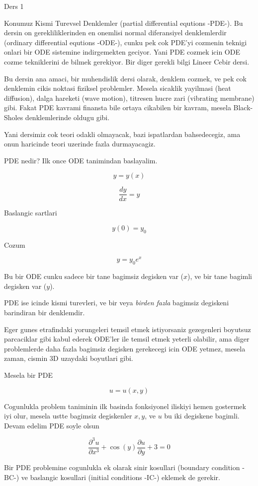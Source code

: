\documentclass[12pt,fleqn]{article}\usepackage{../common}
\begin{document}
Ders 1

Konumuz Kismi Turevsel Denklemler (partial differential equtions -PDE-). Bu
dersin on gerekliliklerinden en onemlisi normal diferansiyel denklemlerdir
(ordinary differential equtions -ODE-), cunku pek cok PDE'yi cozmenin
teknigi onlari bir ODE sistemine indirgemekten geciyor. Yani PDE cozmek
icin ODE cozme tekniklerini de bilmek gerekiyor. Bir diger gerekli bilgi
Lineer Cebir dersi.

Bu dersin ana amaci, bir muhendislik dersi olarak, denklem cozmek, ve pek
cok denklemin cikis noktasi fiziksel problemler. Mesela sicaklik yayilmasi
(heat diffusion), dalga hareketi (wave motion), titresen hucre zari
(vibrating membrane) gibi. Fakat PDE kavrami finansta bile ortaya cikabilen
bir kavram, mesela Black-Sholes denklemlerinde oldugu gibi. 

Yani dersimiz cok teori odakli olmayacak, bazi ispatlardan bahsedecegiz,
ama onun haricinde teori uzerinde fazla durmayacagiz. 

PDE nedir? Ilk once ODE tanimindan baslayalim. 

\[ y = y(x) \]

\[ \frac{dy}{dx} = y \]

Baslangic sartlari 

\[ y(0) = y_0 \]

Cozum 

\[ y = y_0e^x \]

Bu bir ODE cunku sadece bir tane bagimsiz degisken var ($x$), ve bir tane
bagimli degisken var ($y$). 

PDE ise icinde kismi turevleri, ve bir veya {\em birden fazla} bagimsiz
degiskeni barindiran bir denklemdir.

Eger gunes etrafindaki yorungeleri temsil etmek istiyorsaniz gezegenleri
boyutsuz parcaciklar gibi kabul ederek ODE'ler ile temsil etmek yeterli
olabilir, ama diger problemlerde daha fazla bagimsiz degisken gerekecegi
icin ODE yetmez, mesela zaman, cismin 3D uzaydaki boyutlari gibi.

Mesela bir PDE

\[ u = u(x,y) \]

Cogunlukla problem taniminin ilk basinda fonksiyonel iliskiyi hemen
gostermek iyi olur, mesela ustte bagimsiz degiskenler $x,y$, ve $u$ bu iki
degiskene bagimli. Devam edelim PDE soyle olsun

\[ \frac{\partial^3 u}{\partial x^3} + 
\cos(y)\frac{\partial u}{\partial y} + 3 = 0
\]

Bir PDE problemine cogunlukla ek olarak sinir kosullari (boundary condition
-BC-) ve baslangic kosullari (initial conditions -IC-) eklemek de gerekir. 
\end{document}
